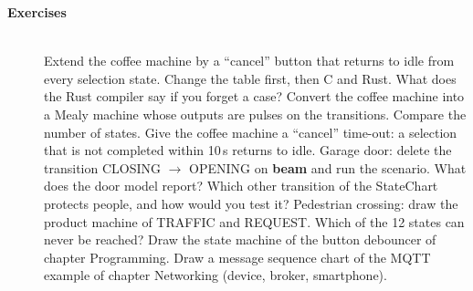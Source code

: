 \begin{description}
\item[{\rot\bf Exercises}]~\\[-\lblskip]
\bi
	\ite Extend the coffee machine by a ``cancel'' button that returns to idle from every selection state. Change the table first, then C and Rust. What does the Rust compiler say if you forget a case?
	\ite Convert the coffee machine into a Mealy machine whose outputs are pulses on the transitions. Compare the number of states.
	\ite Give the coffee machine a ``cancel'' time-out: a selection that is not completed within 10\,s returns to idle.
	\ite Garage door: delete the transition CLOSING $\rightarrow$ OPENING on \textbf{beam} and run the scenario. What does the door model report? Which other transition of the StateChart protects people, and how would you test it?
	\ite Pedestrian crossing: draw the product machine of TRAFFIC and REQUEST. Which of the 12 states can never be reached?
	\ite Draw the state machine of the button debouncer of chapter Programming.
	\ite Draw a message sequence chart of the MQTT example of chapter Networking (device, broker, smartphone).
\ei
\end{description}
